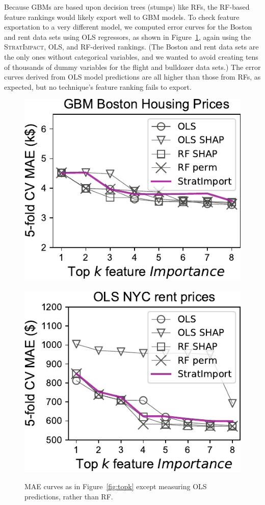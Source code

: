 \documentclass[11pt]{article}
\newcommand{\figref}[1]{Figure~\ref{#1}}
\newcommand{\simp}{\fontfamily{cmr}\textsc{\small StratImpact}}
\begin{document}
Because GBMs are based upon decision trees (stumps) like RFs, the RF-based feature rankings would likely export well to GBM models.  To check feature exportation to a very different model, we computed error curves for the Boston and rent  data sets using OLS regressors, as shown in \figref{fig:OLS}, again using the \simp{}, OLS, and RF-derived rankings. (The Boston and rent data sets are the only ones without categorical variables, and we wanted to avoid creating tens of thousands of dummy variables for the flight and bulldozer data sets.) The error curves derived from OLS model predictions are all higher than those from RFs, as expected, but no technique's feature ranking fails to export.

\begin{figure}[htbp]
\begin{center}
\includegraphics[scale=0.5]{images/boston-topk-OLS-Importance.pdf}~~~
\includegraphics[scale=0.5]{images/rent-topk-OLS-Importance.pdf}
\caption[short]{\small MAE curves as in \figref{fig:topk} except measuring OLS predictions, rather than RF.}
\label{fig:OLS}
\end{center}
\end{figure}
\end{document}
